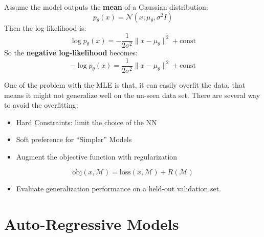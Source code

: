 \documentclass[
  12pt,
]{article}
\providecommand{\tightlist}{%
  \setlength{\itemsep}{0pt}\setlength{\parskip}{0pt}}\usepackage{longtable,booktabs,array}
\theoremstyle{plain}
\theoremstyle{remark}
\begin{document}
\begin{tcolorbox}[enhanced jigsaw, toprule=.15mm, colframe=quarto-callout-note-color-frame, bottomrule=.15mm, rightrule=.15mm, colbacktitle=quarto-callout-note-color!10!white, opacitybacktitle=0.6, colback=white, arc=.35mm, bottomtitle=1mm, left=2mm, leftrule=.75mm, breakable, title=\textcolor{quarto-callout-note-color}{\faInfo}\hspace{0.5em}{Why we can convert MLE to loss fucn}, titlerule=0mm, toptitle=1mm, opacityback=0, coltitle=black]

Assume the model outputs the \textbf{mean} of a Gaussian distribution:
\[p_\theta(x) = \mathcal{N}(x; \mu_\theta, \sigma^2 I)\] Then the
log-likelihood is:
\[\log p_\theta(x) = -\frac{1}{2\sigma^2} \|x - \mu_\theta\|^2 + \text{const}\]
So the \textbf{negative log-likelihood} becomes:
\[-\log p_\theta(x) = \frac{1}{2\sigma^2} \|x - \mu_\theta\|^2 + \text{const}\]

One of the problem with the MLE is that, it can easily overfit the data,
that means it might not generalize well on the un-seen data set. There
are several way to avoid the overfitting:

\begin{itemize}
\tightlist
\item
  Hard Constraints: limit the choice of the NN
\item
  Soft preference for ``Simpler'' Models
\item
  Augment the objective function with regularization
\end{itemize}

\[
\text{obj}(x, \mathcal{M}) = \text{loss}(x, \mathcal{M}) + R(\mathcal{M})
\]

\begin{itemize}
\tightlist
\item
  Evaluate generalization performance on a held-out validation set.
\end{itemize}

\end{tcolorbox}

\section{Auto-Regressive Models}\label{auto-regressive-models}
\end{document}
